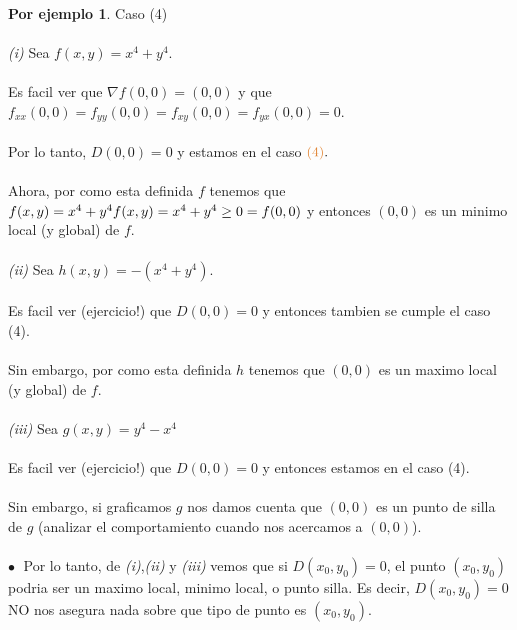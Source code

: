 \documentclass{article}
\theoremstyle{definition}
\newtheorem*{ej}{Por ejemplo}
\theoremstyle{remark}
\newcommand\bl{$\bullet\;$}
\begin{document}
\begin{ej}
  Caso \textcolor{rojop2}{(4)} \\\\
  \textcolor{verdep2}{\emph{(i)\phantom{ii}}} Sea $f(x,y)=x^4+y^4$.\\\\ Es facil ver que $\nabla f (0,0)=(0,0)$ y que \mbox{$f_{xx}(0,0)=f_{yy}(0,0)=f_{xy}(0,0)=f_{yx}(0,0)=0$}.\\\\ Por lo tanto, $D(0,0)=0$ y estamos en el caso $\textcolor{rojop2}{(4)}.$\\\\ Ahora, por como esta definida $f$ tenemos que $f(x,y)=x^4+y^4 \\\\ f(x,y)=x^4+y^4 \geq 0 =f(0,0)$ y entonces $(0,0)$ es un minimo local (y global) de $f$. \\\\
  \textcolor{verdep2}{\emph{(ii)\phantom{i}}} Sea $h(x,y)=-(x^4+y^4)$. \\\\ Es facil ver (ejercicio!) que $D(0,0)=0$ y entonces tambien se cumple el caso \textcolor{rojop2}{(4)}.\\\\Sin embargo, por como esta definida $h$ tenemos que $(0,0)$ es un maximo local (y global) de $f$.\\\\
  \textcolor{verdep2}{\emph{(iii)}} Sea $g(x,y)=y^4-x^4$ \\\\
  Es facil ver (ejercicio!) que $D(0,0)=0$ y entonces estamos en el caso \textcolor{rojop2}{(4)}. \\\\Sin embargo, si graficamos $g$ nos damos cuenta que $(0,0)$ es un punto de silla de $g$ \big(analizar el comportamiento cuando nos acercamos a $(0,0)$\big). \\\\
  \textcolor{azulp2}{\bl} Por lo tanto, de \textcolor{verdep2}{\emph{(i)}},\textcolor{verdep2}{\emph{(ii)}} y \textcolor{verdep2}{\emph{(iii)}} vemos que si $D(x_0,y_0)=0$, el punto $(x_0,y_0)$ podria ser un maximo local, minimo local, o punto silla. Es decir, $D(x_0,y_0)=0$ NO nos asegura nada sobre que tipo de punto es $(x_0,y_0)$.
\end{ej}
\end{document}
